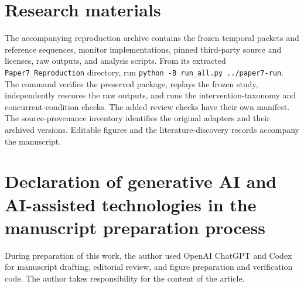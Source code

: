 \documentclass[preprint,11pt]{elsarticle}
\newcommand{\code}[1]{\texttt{#1}}
\begin{document}
\section*{Research materials}
The accompanying reproduction archive contains the frozen temporal packets and reference sequences, monitor implementations, pinned third-party source and licenses, raw outputs, and analysis scripts. From its extracted \code{Paper7\_Reproduction} directory, run \code{python -B run\_all.py ../paper7-run}. The command verifies the preserved package, replays the frozen study, independently rescores the raw outputs, and runs the intervention-taxonomy and concurrent-condition checks. The added review checks have their own manifest. The source-provenance inventory identifies the original adapters and their archived versions. Editable figures and the literature-discovery records accompany the manuscript.

\section*{Declaration of generative AI and AI-assisted technologies in the manuscript preparation process}
During preparation of this work, the author used OpenAI ChatGPT and Codex for manuscript drafting, editorial review, and figure preparation and verification code. The author takes responsibility for the content of the article.



\end{document}
